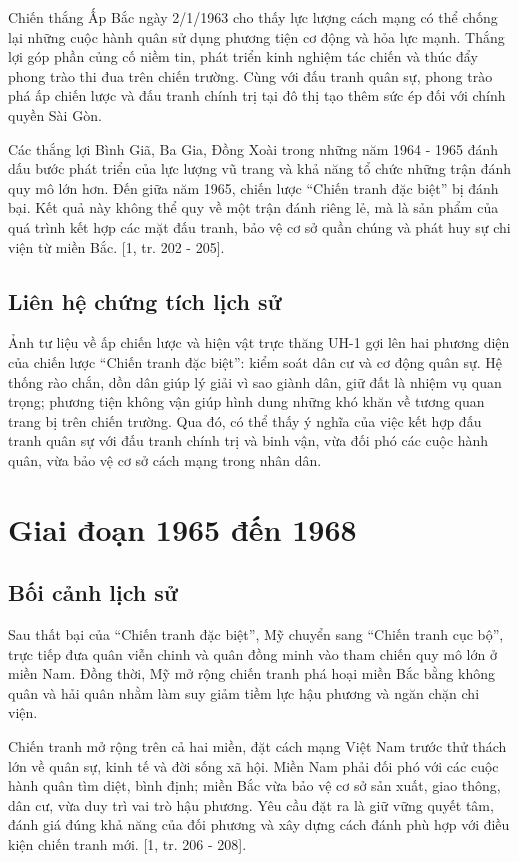 Chiến thắng Ấp Bắc ngày 2/1/1963 cho thấy lực lượng cách mạng có thể chống lại những cuộc hành quân sử dụng phương tiện cơ động và hỏa lực mạnh. Thắng lợi góp phần củng cố niềm tin, phát triển kinh nghiệm tác chiến và thúc đẩy phong trào thi đua trên chiến trường. Cùng với đấu tranh quân sự, phong trào phá ấp chiến lược và đấu tranh chính trị tại đô thị tạo thêm sức ép đối với chính quyền Sài Gòn.

Các thắng lợi Bình Giã, Ba Gia, Đồng Xoài trong những năm 1964 - 1965 đánh dấu bước phát triển của lực lượng vũ trang và khả năng tổ chức những trận đánh quy mô lớn hơn. Đến giữa năm 1965, chiến lược “Chiến tranh đặc biệt” bị đánh bại. Kết quả này không thể quy về một trận đánh riêng lẻ, mà là sản phẩm của quá trình kết hợp các mặt đấu tranh, bảo vệ cơ sở quần chúng và phát huy sự chi viện từ miền Bắc. [1, tr. 202 - 205].

\subsection{Liên hệ chứng tích lịch sử}

Ảnh tư liệu về ấp chiến lược và hiện vật trực thăng UH-1 gợi lên hai phương diện của chiến lược “Chiến tranh đặc biệt”: kiểm soát dân cư và cơ động quân sự. Hệ thống rào chắn, dồn dân giúp lý giải vì sao giành dân, giữ đất là nhiệm vụ quan trọng; phương tiện không vận giúp hình dung những khó khăn về tương quan trang bị trên chiến trường. Qua đó, có thể thấy ý nghĩa của việc kết hợp đấu tranh quân sự với đấu tranh chính trị và binh vận, vừa đối phó các cuộc hành quân, vừa bảo vệ cơ sở cách mạng trong nhân dân.

\section{Giai đoạn 1965 đến 1968}

\subsection{Bối cảnh lịch sử}

Sau thất bại của “Chiến tranh đặc biệt”, Mỹ chuyển sang “Chiến tranh cục bộ”, trực tiếp đưa quân viễn chinh và quân đồng minh vào tham chiến quy mô lớn ở miền Nam. Đồng thời, Mỹ mở rộng chiến tranh phá hoại miền Bắc bằng không quân và hải quân nhằm làm suy giảm tiềm lực hậu phương và ngăn chặn chi viện.

Chiến tranh mở rộng trên cả hai miền, đặt cách mạng Việt Nam trước thử thách lớn về quân sự, kinh tế và đời sống xã hội. Miền Nam phải đối phó với các cuộc hành quân tìm diệt, bình định; miền Bắc vừa bảo vệ cơ sở sản xuất, giao thông, dân cư, vừa duy trì vai trò hậu phương. Yêu cầu đặt ra là giữ vững quyết tâm, đánh giá đúng khả năng của đối phương và xây dựng cách đánh phù hợp với điều kiện chiến tranh mới. [1, tr. 206 - 208].


